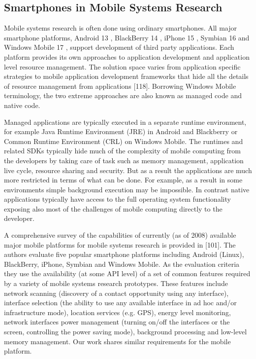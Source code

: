 \subsection{Smartphones in Mobile Systems Research}

Mobile systems research is often done using ordinary smartphones. All major smartphone platforms, Android 13 , BlackBerry 14 , iPhone 15 , Symbian 16 and Windows
Mobile 17 , support development of third party applications. Each platform provides its own approaches to application development and application level resource management. The solution space varies from application specific strategies to mobile application development frameworks that hide all the details of
resource management from applications [118]. Borrowing Windows Mobile terminology, the two extreme approaches are also known as managed code and native code.

Managed applications are typically executed in a separate runtime environment, for example Java Runtime Environment (JRE) in Android and Blackberry or Common
Runtime Environment (CRL) on Windows Mobile. The runtimes and related SDKs typically hide much of the complexity of mobile computing from the developers by
taking care of task such as memory management, application live cycle, resource sharing and security. But as a result the applications are much more restricted in terms of
what can be done. For example, as a result in some environments simple background execution may be impossible. In contrast native applications typically have access to
the full operating system functionality exposing also most of the challenges of mobile computing directly to the developer.

A comprehensive survey of the capabilities of currently (as of 2008) available major mobile platforms for mobile systems research is provided in [101]. The authors
evaluate five popular smartphone platforms including Android (Linux), BlackBerry, iPhone, Symbian and Windows Mobile. As the evaluation criteria they use 
the availability (at some API level) of a set of common features required by a variety of mobile systems research prototypes. These features include network scanning (discovery of
a contact opportunity using any interface), interface selection (the ability to use any available interface in ad hoc and/or infrastructure mode), location services (e.g. GPS),
energy level monitoring, network interfaces power management (turning on/off the interfaces or the screen, controlling the power saving mode), background processing
and low-level memory management. Our work shares similar requirements for the mobile platform.

